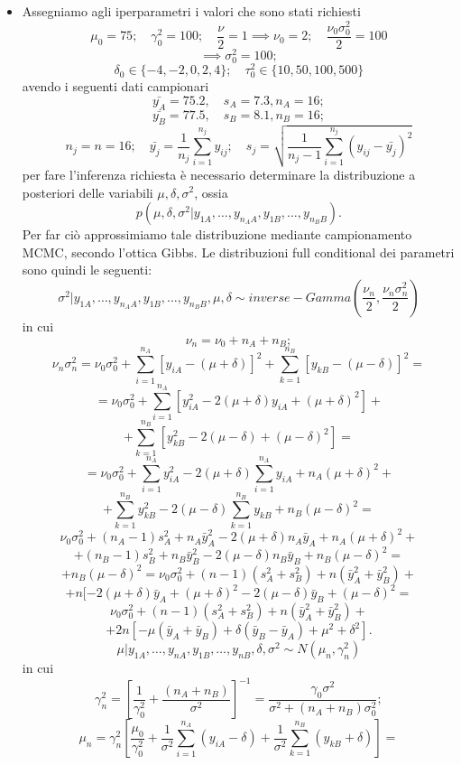 \begin{itemize}[-]
\item Assegniamo agli iperparametri i valori che sono stati richiesti
\[
\mu_0 = 75; \quad \gamma_0^2 = 100; \quad \frac{\nu}{2} = 1 \implies \nu_0 = 2; \quad \frac{\nu_0\sigma_0^2}{2}=100
\]
\[
\implies \sigma_0^2 = 100;
\]
\[
\delta_0 \in \{-4,-2,0,2,4\}; \quad \tau_0^2 \in \{10,50,100,500\}
\]
avendo i seguenti dati campionari
\[
\bar{y_A} = 75.2, \quad s_A = 7.3, n_A = 16;
\]
\[
\bar{y_B} = 77.5, \quad s_B = 8.1, n_B = 16;
\]
\[
n_j=n=16; \quad \bar{y_j}=\frac{1}{n_j}\sum_{i=1}^{n_j}y_{ij}; \quad s_j = \sqrt{\frac{1}{n_j-1}\sum_{i=1}^{n_j}(y_{ij}-\bar{y_j})^2}
\]
per fare l'inferenza richiesta è necessario determinare la distribuzione a posteriori delle variabili $\mu,\delta,\sigma^2$, ossia
$$p(\mu,\delta,\sigma^2|y_{1A},\dots,y_{n_AA},y_{1B},\dots,y_{n_BB}).$$ 
Per far ciò approssimiamo tale distribuzione mediante campionamento MCMC, secondo l'ottica Gibbs. Le distribuzioni full conditional dei parametri sono quindi le seguenti:
\[
\sigma^2 | y_{1A},\dots,y_{n_AA},y_{1B},\dots,y_{n_BB}, \mu, \delta \sim inverse-Gamma(\frac{\nu_n}{2},\frac{\nu_n\sigma_n^2}{2}) 
\]
in cui 
\[
\nu_n = \nu_0 + n_A + n_B;
\]
\[
\nu_n \sigma_n^2=\nu_0\sigma_0^2+\sum_{i=1}^{n_A}[y_{iA}-(\mu+\delta)]^2+ \sum_{k=1}^{n_B}[y_{kB}-(\mu-\delta)]^2=
\]
\[
=\nu_0\sigma_0^2 + \sum_{i=1}^{n_A}[y_{iA}^2-2(\mu+\delta)y_{iA} + (\mu + \delta)^2] +
\]
\[
 +\sum_{k=1}^{n_B}[y_{kB}^2-2(\mu-\delta) + (\mu - \delta)^2]=
\]
\[
=\nu_0\sigma_0^2 + \sum_{i=1}^{n_A}y_{iA}^2 - 2(\mu + \delta)\sum_{i=1}^{n_A}y_{iA} + n_A(\mu + \delta)^2+ 
\]
\[
+ \sum_{k=1}^{n_B}y_{kB}^2 - 2(\mu-\delta)\sum_{k=1}^{n_B}y_{kB} + n_B(\mu-\delta)^2=
\]
\[
\nu_0\sigma_0^2+(n_A-1)s_A^2+n_A\bar{y}_A^2-2(\mu + \delta)n_A\bar{y}_A+n_{A}(\mu+\delta)^2+
\]
\[
+(n_B-1)s_B^2+n_B\bar{y}_B^2-2(\mu-\delta)n_B\bar{y}_B+n_B(\mu-\delta)^2=
\]
\[
+n_B(\mu-\delta)^2=\nu_0\sigma_0^2 +(n-1)(s_A^2+s_B^2)+n(\bar{y}_A^2+\bar{y}_B^2)+
\]
\[
+n[-2(\mu+\delta)\bar{y}_A+(\mu+\delta)^2-2(\mu-\delta)\bar{y}_B+(\mu-\delta)^2=
\]
\[
\nu_0\sigma_0^2+(n-1)(s_A^2+s_B^2)+n(\bar{y}_A^2+\bar{y}_B^2)+
\]
\[
+2n[-\mu(\bar{y}_A+\bar{y}_B)+\delta(\bar{y}_B-\bar{y}_A)+\mu^2 + \delta^2].
\]
\[
\mu|y_{1A},\dots,y_{nA},y_{1B},\dots,y_{nB},\delta,\sigma^2 \sim N(\mu_n,\gamma_n^2)
\]
in cui 
\[
\gamma_n^2=[\frac{1}{\gamma_0^2}+\frac{(n_A+n_B)}{\sigma^2}]^{-1} = \frac{\gamma_0\sigma^2}{\sigma^2+(n_A+n_B)\sigma_0^2};
\]
\[
\mu_n =\gamma_n^2[\frac{\mu_0}{\gamma_0^2}+\frac{1}{\sigma^2}\sum_{i=1}^{n_A}(y_{iA}-\delta)+\frac{1}{\sigma^2}\sum_{k=1}^{n_B}(y_{kB}+\delta)]= 
\]

\end{itemize}
